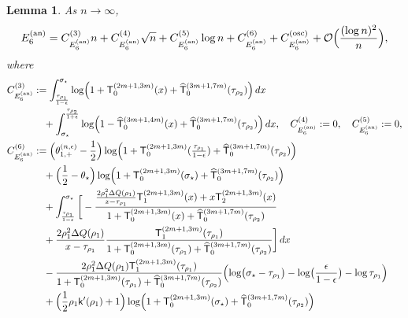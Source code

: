 \documentclass[a4paper]{article}
\newtheorem{lemma}[theorem]{Lemma}
\numberwithin{equation}{section}
\begin{document}
\begin{lemma}\label{lemma:asymptotic expansion E6 annulus}
As $n\to\infty$,
 \begin{align}
    E_{6}^{(\mathrm{an})}
    =
C_{E_{6}^{(\mathrm{an})}}^{(3)}n
+
C_{E_{6}^{(\mathrm{an})}}^{(4)}\sqrt{n}
+
C_{E_{6}^{(\mathrm{an})}}^{(5)}\log n
+
C_{E_{6}^{(\mathrm{an})}}^{(6)}
+
C_{E_{6}^{(\mathrm{an})}}^{(\mathrm{osc})}
+\mathcal{O}\Bigl(\frac{(\log n)^2}{n}\Bigr),    
\end{align}   
where 
\begin{align*}
C_{E_{6}^{(\mathrm{an})}}^{(3)}
&:=
\int_{\frac{\tau_{\rho_1}}{1-\epsilon}}^{\sigma_{\star}}
\log\Bigl(1+\mathsf{T}_{0}^{(2m+1,3m)}(x)+\widehat{\mathsf{T}}_0^{(3m+1,7m)}(\tau_{\rho_2})\Bigr)\,dx
\\
&\quad
+
\int_{\sigma_{\star}}^{\frac{\tau_{\rho_2}}{1+\epsilon}}
\log\Bigl(1-\widehat{\mathsf{T}}_0^{(3m+1,4m)}(x)+\widehat{\mathsf{T}}_0^{(3m+1,7m)}(\tau_{\rho_2})\Bigr)\,dx,
\quad
C_{E_{6}^{(\mathrm{an})}}^{(4)}
:=0,
\quad
C_{E_{6}^{(\mathrm{an})}}^{(5)}
:=0,
\\
C_{E_{6}^{(\mathrm{an})}}^{(6)}
&:=
\Bigl(\theta_{1,+}^{(n,\epsilon)}-\frac{1}{2}\Bigr)
\log\Bigl(1+\mathsf{T}_{0}^{(2m+1,3m)}(\tfrac{\tau_{\rho_1}}{1-\epsilon})+\widehat{\mathsf{T}}_0^{(3m+1,7m)}(\tau_{\rho_2})\Bigr)
\\
&\quad 
+\Bigl(\frac{1}{2}-\theta_{\star}\Bigr)
\log\Bigl(1+\mathsf{T}_{0}^{(2m+1,3m)}(\sigma_{\star})+\widehat{\mathsf{T}}_0^{(3m+1,7m)}(\tau_{\rho_2})\Bigr)
\\
&\quad 
+
\int_{\frac{\tau_{\rho_1}}{1-\epsilon}}^{\sigma_{\star}}
\bigg[
-\frac{\frac{2\rho_1^2\Delta Q(\rho_1)}{x-\tau_{\rho_1}}
\mathsf{T}_{1}^{(2m+1,3m)}(x)
+x\mathsf{T}_{2}^{(2m+1,3m)}(x)
}{
1+\mathsf{T}_{0}^{(2m+1,3m)}(x)+\widehat{\mathsf{T}}_0^{(3m+1,7m)}(\tau_{\rho_2})}
\\
&\quad 
+
\frac{2\rho_1^2\Delta Q(\rho_1)}{x-\tau_{\rho_1}}
\frac{\mathsf{T}_{1}^{(2m+1,3m)}(\tau_{\rho_1})}{1+\mathsf{T}_{0}^{(2m+1,3m)}(\tau_{\rho_1})+\widehat{\mathsf{T}}_0^{(3m+1,7m)}(\tau_{\rho_2})}
\bigg]
\,dx
\\
&\quad 
-
\frac{2\rho_1^2\Delta Q(\rho_1)\mathsf{T}_{1}^{(2m+1,3m)}(\tau_{\rho_1})}{1+\mathsf{T}_{0}^{(2m+1,3m)}(\tau_{\rho_1})+\widehat{\mathsf{T}}_0^{(3m+1,7m)}(\tau_{\rho_2})}
\Bigl( 
\log\bigl(\sigma_{\star}-\tau_{\rho_1}\bigr)-\log\bigl(\frac{\epsilon}{1-\epsilon}\bigr)
-\log \tau_{\rho_1}
\Bigr)
\\
&\quad 
+
\Bigl(\frac{1}{2}\rho_1\mathsf{k}'(\rho_1)+1\Bigr)
\log\Bigl(1+\mathsf{T}_{0}^{(2m+1,3m)}(\sigma_{\star})+\widehat{\mathsf{T}}_0^{(3m+1,7m)}(\tau_{\rho_2})\Bigr)

\end{align*}
\end{lemma}
\end{document}
